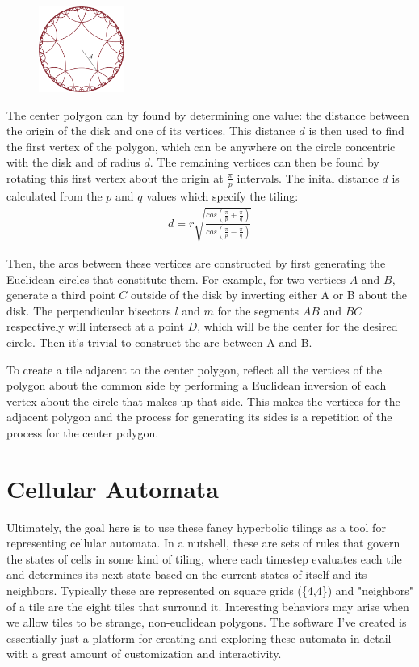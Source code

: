 \documentclass[letterpaper,12pt]{article}
\begin{document}
\begin{figure}
\includegraphics[width=0.25\textwidth]{../media/tilingDistance.png}
\end{figure}

The center polygon can by found by determining one value: the distance between the origin of the disk and one of its vertices. This distance $d$ is then used to find the first vertex of the polygon, which can be anywhere on the circle concentric with the disk and of radius $d$.  The remaining vertices can then be found by rotating this first vertex about the origin at $\frac{\pi}{p}$ intervals. The inital distance $d$ is calculated from the $p$ and $q$ values which specify the tiling:
\begin{gather*}
d = r\sqrt{\frac{cos(\frac{\pi}{p} + \frac{\pi}{q})}{cos(\frac{\pi}{p} - \frac{\pi}{q})}}
\end{gather*}

Then, the arcs between these vertices are constructed by first generating the Euclidean circles that constitute them. For example, for two vertices $A$ and $B$, generate a third point $C$ outside of the disk by inverting either A or B about the disk. The perpendicular bisectors $l$ and $m$ for the segments $AB$ and $BC$ respectively will intersect at a point $D$, which will be the center for the desired circle. Then it's trivial to construct the arc between A and B.

To create a tile adjacent to the center polygon, reflect all the vertices of the polygon about the common side by performing a Euclidean inversion of each vertex about the circle that makes up that side. This makes the vertices for the adjacent polygon and the process for generating its sides is a repetition of the process for the center polygon.

\section*{Cellular Automata}

Ultimately, the goal here is to use these fancy hyperbolic tilings as a tool for representing cellular automata. In a nutshell, these are sets of rules that govern the states of cells in some kind of tiling, where each timestep evaluates each tile and determines its next state based on the current states of itself and its neighbors. Typically these are represented on square grids (\{4,4\}) and "neighbors" of a tile are the eight tiles that surround it. Interesting behaviors may arise when we allow tiles to be strange, non-euclidean polygons. The software I've created is essentially just a platform for creating and exploring these automata in detail with a great amount of customization and interactivity.
\end{document}
